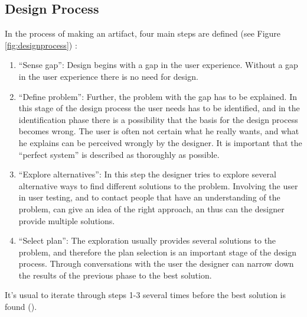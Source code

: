\subsection{Design Process}
\label{sec:designprocess}
In the process of making an artifact, four main steps are defined (see Figure \ref{fig:designprocess}) :
\begin{enumerate}
 \item ``Sense gap'': Design begins with a gap in the user experience. Without a gap in the user experience there is no need for design.
 \item ``Define problem'': Further, the problem with the gap has to be explained. In this stage of the design process the user needs has to be identified, and in the identification phase there is a possibility that the basis for the design process becomes wrong. The user is often not certain what he really wants, and what he explains can be perceived wrongly by the designer. It is important that the ``perfect system'' is described as thoroughly as possible.
 \item ``Explore alternatives'': In this step the designer tries to explore several alternative ways to find  different solutions to the problem. Involving the user in user testing, and to contact people that have an understanding of the problem, can give an idea of the right approach, an thus can the designer provide multiple solutions.
     \item ``Select plan'': The exploration usually provides several solutions to the problem, and therefore the plan selection is an important stage of the design process. Through conversations with the user the designer can narrow down the results of the previous phase to the best solution.
 \end{enumerate}
 It's usual to iterate through steps 1-3 several times before the best solution is found (\cite{ulrich}).
 

